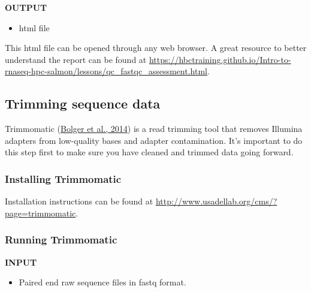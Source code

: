 \documentclass[
  12pt,
]{article}
\newenvironment{Shaded}{\begin{snugshade}}{\end{snugshade}}
\newcommand{\CommentTok}[1]{\textcolor[rgb]{0.56,0.35,0.01}{\textit{#1}}}
\newcommand{\ControlFlowTok}[1]{\textcolor[rgb]{0.13,0.29,0.53}{\textbf{#1}}}
\newcommand{\ExtensionTok}[1]{#1}
\newcommand{\KeywordTok}[1]{\textcolor[rgb]{0.13,0.29,0.53}{\textbf{#1}}}
\newcommand{\NormalTok}[1]{#1}
\newcommand{\PreprocessorTok}[1]{\textcolor[rgb]{0.56,0.35,0.01}{\textit{#1}}}
\newcommand{\VariableTok}[1]{\textcolor[rgb]{0.00,0.00,0.00}{#1}}
\providecommand{\tightlist}{%
  \setlength{\itemsep}{0pt}\setlength{\parskip}{0pt}}
\begin{document}
\begin{Shaded}
\end{Shaded}

\textbf{OUTPUT}

\begin{itemize}
\tightlist
\item
  html file
\end{itemize}

This html file can be opened through any web browser. A great resource to better understand the report can be found at \url{https://hbctraining.github.io/Intro-to-rnaseq-hpc-salmon/lessons/qc_fastqc_assessment.html}.

\hypertarget{trimming-sequence-data}{%
\subsection{Trimming sequence data}\label{trimming-sequence-data}}

Trimmomatic (\protect\hyperlink{ref-Bolger2014}{Bolger et al., 2014}) is a read trimming tool that removes Illumina adapters from low-quality bases and adapter contamination. It's important to do this step first to make sure you have cleaned and trimmed data going forward.

\hypertarget{installing-trimmomatic}{%
\subsubsection{Installing Trimmomatic}\label{installing-trimmomatic}}

Installation instructions can be found at \url{http://www.usadellab.org/cms/?page=trimmomatic}.

\hypertarget{running-trimmomatic}{%
\subsubsection{Running Trimmomatic}\label{running-trimmomatic}}

\textbf{INPUT}

\begin{itemize}
\tightlist
\item
  Paired end raw sequence files in fastq format.
\end{itemize}
\end{document}

